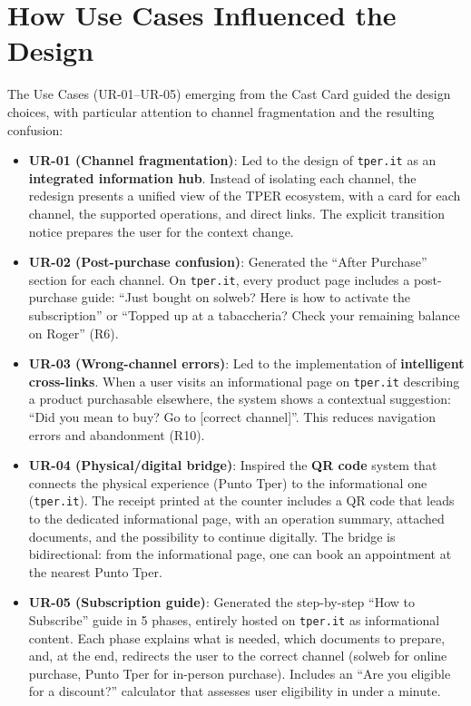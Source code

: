 \vspace{0.3cm}

\section{How Use Cases Influenced the Design}

The Use Cases (UR-01--UR-05) emerging from the Cast Card guided the design choices, with particular attention to channel fragmentation and the resulting confusion:

\begin{itemize}
    \item \textbf{UR-01 (Channel fragmentation)}: Led to the design of \texttt{tper.it} as an \textbf{integrated information hub}. Instead of isolating each channel, the redesign presents a unified view of the TPER ecosystem, with a card for each channel, the supported operations, and direct links. The explicit transition notice prepares the user for the context change.
    \item \textbf{UR-02 (Post-purchase confusion)}: Generated the ``After Purchase'' section for each channel. On \texttt{tper.it}, every product page includes a post-purchase guide: ``Just bought on solweb? Here is how to activate the subscription'' or ``Topped up at a tabaccheria? Check your remaining balance on Roger'' (R6).
    \item \textbf{UR-03 (Wrong-channel errors)}: Led to the implementation of \textbf{intelligent cross-links}. When a user visits an informational page on \texttt{tper.it} describing a product purchasable elsewhere, the system shows a contextual suggestion: ``Did you mean to buy? Go to [correct channel]''. This reduces navigation errors and abandonment (R10).
    \item \textbf{UR-04 (Physical/digital bridge)}: Inspired the \textbf{QR code} system that connects the physical experience (Punto Tper) to the informational one (\texttt{tper.it}). The receipt printed at the counter includes a QR code that leads to the dedicated informational page, with an operation summary, attached documents, and the possibility to continue digitally. The bridge is bidirectional: from the informational page, one can book an appointment at the nearest Punto Tper.
    \item \textbf{UR-05 (Subscription guide)}: Generated the step-by-step ``How to Subscribe'' guide in 5 phases, entirely hosted on \texttt{tper.it} as informational content. Each phase explains what is needed, which documents to prepare, and, at the end, redirects the user to the correct channel (solweb for online purchase, Punto Tper for in-person purchase). Includes an ``Are you eligible for a discount?'' calculator that assesses user eligibility in under a minute.
\end{itemize}

